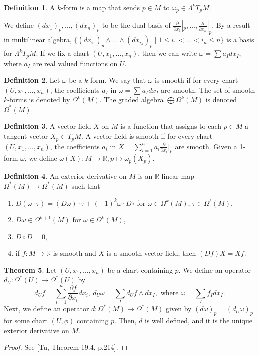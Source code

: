 \documentclass[]{article}
\theoremstyle{definition}
\newtheorem{theorem}{Theorem}[section] %
\theoremstyle{definition}
\newtheorem{definition}[theorem]{Definition} %
\begin{document}
\begin{definition}
    A $k$-form is a map that sends $p\in M$ to $\omega_p\in \Lambda^kT_pM$.
\end{definition}

We define $(dx_1)_p, \dots, (dx_n)_p$ to be the dual basis of $\frac{\partial}{\partial x_1}|_p, \dots, \frac{\partial}{\partial x_n}|_p$. By a result in multilinear algebra, $\{(dx_{i_1})_p\wedge\dots\wedge(dx_{i_k})_p\mid 1\leq i_1<\dots<i_n\leq n\}$ is a basis for $\Lambda^kT_pM$. If we fix a chart $(U, x_1, \dots, x_n)$, then we can write $\omega=\sum a_Idx_I$, where $a_I$ are real valued functions on $U$.

\begin{definition}
Let $\omega$ be a $k$-form. We say that $\omega$ is smooth if for every chart $(U, x_1, \dots, x_n)$, the coefficients $a_I$ in $\omega=\sum a_Idx_I$ are smooth. The set of smooth $k$-forms is denoted by $\Omega^k(M)$. The graded algebra $\bigoplus \Omega^k(M)$ is denoted $\Omega^*(M)$.
\end{definition}

\begin{definition}
    A vector field $X$ on $M$ is a function that assigns to each $p\in M$ a tangent vector $X_p\in T_pM$. A vector field is smooth if for every chart $(U, x_1, \dots, x_n)$, the coefficients $a_i$ in $X=\sum_{i=1}^na_i\frac{\partial}{\partial x_i}|_p$ are smooth. Given a 1-form $\omega$, we define $\omega(X):M \rightarrow \mathbb{R}, p\mapsto \omega_p(X_p)$.
\end{definition}

\begin{definition}
    An exterior derivative on $M$ is an $\mathbb{R}$-linear map $\Omega^*(M) \rightarrow \Omega^*(M)$ such that \begin{enumerate}
        \item $D(\omega\cdot \tau)=(D\omega)\cdot \tau+(-1)^k\omega\cdot D\tau$ for $\omega\in \Omega^k(M)$, $\tau\in \Omega^\ell(M)$,
        \item $D\omega\in\Omega^{k+1}(M)$ for $\omega\in\Omega^k(M)$,
        \item $D\circ D=0$,
        \item if $f:M \rightarrow \mathbb{R}$ is smooth and $X$ is a smooth vector field, then $(Df)X=Xf$.
    \end{enumerate}
\end{definition}

\begin{theorem}
    Let $(U, x_1, \dots, x_n)$ be a chart containing $p$. We define an operator $d_U:\Omega^*(U) \rightarrow \Omega^*(U)$ by \[d_Uf=\sum_{i=1}^n \frac{\partial f}{\partial x_i}dx_i,\ d_U\omega=\sum_I d_Uf\wedge dx_I,\text{ where }\omega=\sum_I f_I dx_I.\] Next, we define an operator $d:\Omega^*(M)\rightarrow \Omega^*(M)$ given by $(d\omega)_p=(d_U\omega)_p$ for some chart $(U, \phi)$ containing $p$. Then, $d$ is well defined, and it is the unique exterior derivative on $M$.
\end{theorem}
\begin{proof}
    See [Tu, Theorem 19.4, p.214].
\end{proof}
\end{document}
